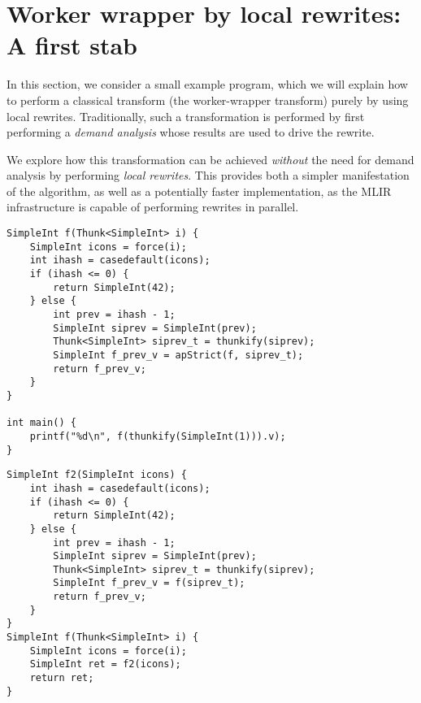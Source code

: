 \documentclass[sigplan,\review anonymous]{acmart}
\newcommand{\lzforce}{\texttt{lz.force}}
\begin{document}
\section{Worker wrapper by local rewrites: A first stab}
In this section, we consider a small example program, which we will explain
how to perform a classical transform (the worker-wrapper transform) purely
by using local rewrites. Traditionally, such a transformation is performed
by first performing a \emph{demand analysis} whose results are used
to drive the rewrite.

We explore how this transformation can be achieved \emph{without} the need
for demand analysis by performing \emph{local rewrites}. This provides
both a simpler manifestation of the algorithm, as well as a potentially 
faster implementation, as the MLIR infrastructure is capable of performing
rewrites in parallel.
{\footnotesize
\begin{lstlisting}[caption=initial source code]
SimpleInt f(Thunk<SimpleInt> i) {
    SimpleInt icons = force(i);
    int ihash = casedefault(icons);
    if (ihash <= 0) {
        return SimpleInt(42);
    } else {
        int prev = ihash - 1;
        SimpleInt siprev = SimpleInt(prev);
        Thunk<SimpleInt> siprev_t = thunkify(siprev);
        SimpleInt f_prev_v = apStrict(f, siprev_t);
        return f_prev_v;
    }
}

int main() {
    printf("%d\n", f(thunkify(SimpleInt(1))).v);
}
\end{lstlisting}
}

{\footnotesize
\begin{lstlisting}[caption=Step 1: outlining everything after the initial \lzforce into \texttt{f2}]
SimpleInt f2(SimpleInt icons) {
    int ihash = casedefault(icons);
    if (ihash <= 0) {
        return SimpleInt(42);
    } else {
        int prev = ihash - 1;
        SimpleInt siprev = SimpleInt(prev);
        Thunk<SimpleInt> siprev_t = thunkify(siprev);
        SimpleInt f_prev_v = f(siprev_t);
        return f_prev_v;
    }
}
SimpleInt f(Thunk<SimpleInt> i) {
    SimpleInt icons = force(i);
    SimpleInt ret = f2(icons);
    return ret;
}
\end{lstlisting}
}
\end{document}
